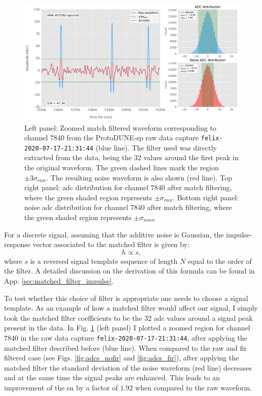 \begin{figure}[t]
	\centering
	\includegraphics[width=1\linewidth]{Images/Matched_Filter/waveform_example_mf}
	\caption[Example matched filtered waveform from a ProtoDUNE-\gls{sp} raw data capture.]{Left panel: Zoomed match filtered waveform corresponding to channel $7840$ from the ProtoDUNE-\gls{sp} raw data capture \texttt{felix-2020-07-17-21:31:44} (blue line). The filter used was directly extracted from the data, being the $32$ values around the first peak in the original waveform. The green dashed lines mark the region $\pm3\sigma_{raw}$. The resulting noise waveform is also shown (red line). Top right panel: \gls{adc} distribution for channel $7840$ after match filtering, where the green shaded region represents $\pm \sigma_{raw}$. Bottom right panel: noise \gls{adc} distribution for channel $7840$ after match filtering, where the green shaded region represents $\pm \sigma_{noise}$}
	\label{fig:adcs_mf}
\end{figure}

For a discrete signal, assuming that the additive noise is Gaussian, the impulse-response vector associated to the matched filter is given by:
\begin{equation}
	h \propto s,
\end{equation}
where $s$ is a reversed signal template sequence of length $N$ equal to the order of the filter. A detailed discussion on the derivation of this formula can be found in App. \ref{sec:matched_filter_impulse}.

To test whether this choice of filter is appropriate one needs to choose a signal template. As an example of how a matched filter would affect our signal, I simply took the matched filter coefficients to be the 32 \gls{adc} values around a signal peak present in the data. In Fig. \ref{fig:adcs_mf} (left panel) I plotted a zoomed region for channel $7840$ in the raw data capture \texttt{felix-2020-07-17-21:31:44}, after applying the matched filter described before (blue line). When compared to the raw and \gls{fir} filtered case (see Figs. \ref{fig:adcs_nofir} and \ref{fig:adcs_fir}), after applying the matched filter the standard deviation of the noise waveform (red line) decreases and at the same time the signal peaks are enhanced. This leads to an improvement of the \gls{sn} by a factor of $1.92$ when compared to the raw waveform.

